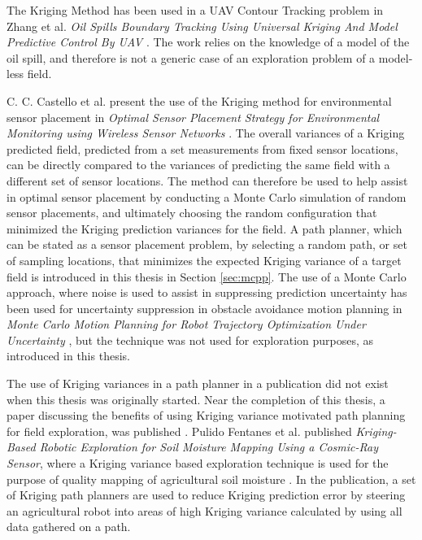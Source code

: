 The Kriging Method has been used in a UAV Contour Tracking problem in Zhang et al. \textit{Oil Spills Boundary Tracking Using Universal Kriging And Model Predictive Control By UAV} \cite{zhang:oil_krig}. The work relies on the knowledge of a model of the oil spill, and therefore is not a generic case of an exploration problem of a model-less field.

C. C. Castello et al. present the use of the Kriging method for environmental sensor placement in \textit{Optimal Sensor Placement Strategy for Environmental Monitoring using Wireless Sensor Networks} \cite{kriging:sensorplacement}. The overall variances of a Kriging predicted field, predicted from a set measurements from fixed sensor locations, can be directly compared to the variances of predicting the same field with a different set of sensor locations. The method can therefore be used to help assist in optimal sensor placement by conducting a Monte Carlo simulation of random sensor placements, and ultimately choosing the random configuration that minimized the Kriging prediction variances for the field. A path planner, which can be stated as a sensor placement problem, by selecting a random path, or set of sampling locations, that minimizes the expected Kriging variance of a target field is introduced in this thesis in Section \ref{sec:mcpp}. The use of a Monte Carlo approach, where noise is used to assist in suppressing prediction uncertainty has been used for uncertainty suppression in obstacle avoidance motion planning in \textit{Monte Carlo Motion Planning for Robot Trajectory Optimization Under Uncertainty} \cite{janson:mcmp}, but the technique was not used for exploration purposes, as introduced in this thesis.

The use of Kriging variances in a path planner in a publication did not exist when this thesis was originally started. Near the completion of this thesis, a paper discussing the benefits of using Kriging variance motivated path planning for field exploration, was published \cite{fentanes:soilkrig}. Pulido Fentanes et al. published \textit{Kriging-Based Robotic Exploration for Soil Moisture Mapping Using a Cosmic-Ray Sensor}, where a Kriging variance based exploration technique is used for the purpose of quality mapping of agricultural soil moisture \cite{fentanes:soilkrig}. In the publication, a set of Kriging path planners are used to reduce Kriging prediction error by steering an agricultural robot into areas of high Kriging variance calculated by using all data gathered on a path. 

